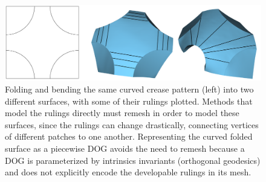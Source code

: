 \begin{figure} [h]
	\centering
	\includegraphics[width=\linewidth]{figures/rulings_problem_curve}
	\caption{Folding and bending the same curved crease pattern (left) into two different surfaces, with some of their rulings plotted. Methods that model the rulings directly must remesh in order to model these surfaces, since the rulings can change drastically, connecting vertices of different patches to one another. Representing the curved folded surface as a piecewise DOG avoids the need to remesh because a DOG is parameterized by intrinsics invariants (orthogonal geodesics) and does not explicitly encode the developable rulings in its mesh. }
	\label{fig:rulings_problem_curve}
\end{figure}

